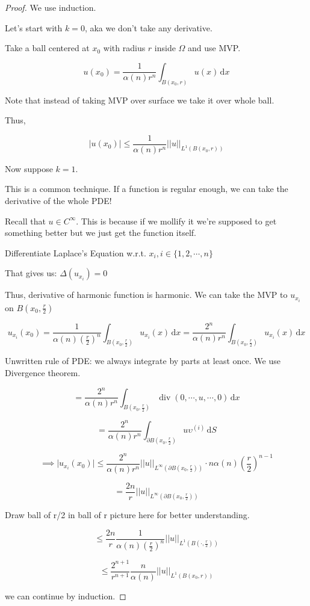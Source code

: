 \documentclass{article}
\theoremstyle{definition}
\begin{document}
\begin{proof}
    
    We use induction.

    Let's start with \(k=0\), aka we don't take any derivative.

    Take a ball centered at \(x_0\) with radius \(r\) inside \(\Omega \) and use MVP.

    \[
        u(x_0)=\frac{1}{\alpha (n)r^n}\int_{B(x_0,r)}^{} u(x) \,\mathrm{d}x 
    \]

    Note that instead of taking MVP over surface we take it over whole ball.

    Thus,

    \[
        \vert u(x_0) \vert \leq \frac{1}{\alpha(n)r^n} \vert \vert u \vert  \vert _{L^1(B(x_0,r))}
    \]

    Now suppose \(k=1\).

    This is a common technique. If a function is regular enough, we can take the derivative of the whole PDE!

    Recall that \(u\in C^{\infty}\). This is because if we mollify it we're supposed to get something better but we just get the function itself.

    Differentiate Laplace's Equation w.r.t. \(x_i,i\in \{ 1,2,\cdots,n \} \) 

    That gives us: \(\Delta (u_{x_i})=0\) 

    Thus, derivative of harmonic function is harmonic. We can take the MVP to \(u_{x_i}\) on \(B(x_0,\frac{r}{2})\) 

    \[
        u_{x_i}(x_0)=\frac{1}{\alpha (n)(\frac{r}{2})^n} \int_{B(x_0,\frac{r}{2})}^{} u_{x_i}(x) \,\mathrm{d}x = \frac{2^n}{\alpha (n)r^n} \int_{B(x_0,\frac{r}{2})}^{} u_{x_i}(x) \,\mathrm{d}x
    \]

    Unwritten rule of PDE: we always integrate by parts at least once. We use Divergence theorem.

    \[
        =\frac{2^n}{\alpha (n)r^n} \int_{B(x_0,\frac{r}{2})}^{} \operatorname{div}(0,\cdots,u,\cdots,0) \,\mathrm{d}x 
    \]

    \[
        =\frac{2^n}{\alpha(n)r^n} \int_{\partial B(x_0,\frac{r}{2})}^{} u \upsilon^{(i)} \,\mathrm{d}S 
    \]

    \[
        \implies \vert u_{x_i}(x_0) \vert \leq \frac{2^n}{\alpha(n)r^n} \vert \vert u \vert  \vert _{L^{\infty}(\partial B(x_0,\frac{r}{2}))}\cdot n \alpha (n)(\frac{r}{2})^{n-1} 
    \]

    \[
        =\frac{2n}{r} \vert \vert u \vert  \vert _{L^{\infty}(\partial B(x_0,\frac{r}{2}))}
    \]

    Draw ball of r/2 in ball of r picture here for better understanding.

    \[
        \leq \frac{2n}{r} \frac{1}{\alpha(n)(\frac{r}{2})^n} \vert \vert u \vert  \vert_{L^1(B(\cdot,\frac{r}{2}))}
    \]

    \[
        \leq \frac{2^{n+1}}{r^{n+1} } \frac{n}{\alpha (n)} \vert \vert u \vert  \vert _{L^1(B(x_0,r))}
    \]

    we can continue by induction.

\end{proof}
\end{document}
